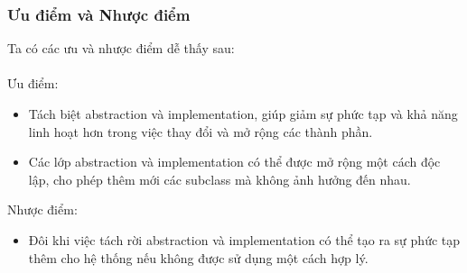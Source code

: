 \subsubsection{Ưu điểm và Nhược điểm}
Ta có các ưu và nhược điểm dễ thấy sau:\\\\
Ưu điểm:
\begin{itemize}
    \item Tách biệt abstraction và implementation, giúp giảm sự phức tạp và khả năng linh hoạt hơn trong việc thay đổi và mở rộng các thành phần.
    \item Các lớp abstraction và implementation có thể được mở rộng một cách độc lập, cho phép thêm mới các subclass mà không ảnh hưởng đến nhau.
\end{itemize}
Nhược điểm:
\begin{itemize}
    \item Đôi khi việc tách rời abstraction và implementation có thể tạo ra sự phức tạp thêm cho hệ thống nếu không được sử dụng một cách hợp lý.
\end{itemize}
